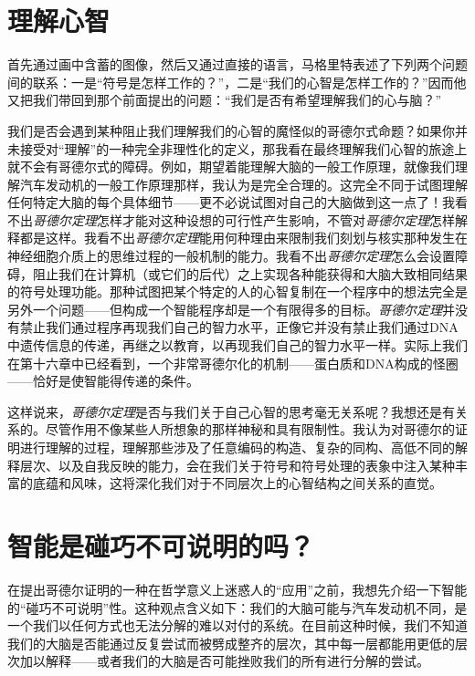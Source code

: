 \section{理解心智}

首先通过画中含蓄的图像，然后又通过直接的语言，马格里特表述了下列两个问题间的联系：一是“符号是怎样工作的？”，二是“我们的心智是怎样工作的？”因而他又把我们带回到那个前面提出的问题：“我们是否有希望理解我们的心与脑？”

我们是否会遇到某种阻止我们理解我们的心智的魔怪似的哥德尔式命题？如果你并未接受对“理解”的一种完全非理性化的定义，那我看在最终理解我们心智的旅途上就不会有哥德尔式的障碍。例如，期望着能理解大脑的一般工作原理，就像我们理解汽车发动机的一般工作原理那样，我认为是完全合理的。这完全不同于试图理解任何特定大脑的每个具体细节——更不必说试图对自己的大脑做到这一点了！我看不出\emph{哥德尔定理}怎样才能对这种设想的可行性产生影响，不管对\emph{哥德尔定理}怎样解释都是这样。我看不出\emph{哥德尔定理}能用何种理由来限制我们刻划与核实那种发生在神经细胞介质上的思维过程的一般机制的能力。我看不出\emph{哥德尔定理}怎么会设置障碍，阻止我们在计算机（或它们的后代）之上实现各种能获得和大脑大致相同结果的符号处理功能。那种试图把某个特定的人的心智复制在一个程序中的想法完全是另外一个问题——但构成一个智能程序却是一个有限得多的目标。\emph{哥德尔定理}并没有禁止我们通过程序再现我们自己的智力水平，正像它并没有禁止我们通过DNA中遗传信息的传递，再继之以教育，以再现我们自己的智力水平一样。实际上我们在第十六章中已经看到，一个非常哥德尔化的机制——蛋白质和DNA构成的怪圈——恰好是使智能得传递的条件。

这样说来，\emph{哥德尔定理}是否与我们关于自己心智的思考毫无关系呢？我想还是有关系的。尽管作用不像某些人所想象的那样神秘和具有限制性。我认为对哥德尔的证明进行理解的过程，理解那些涉及了任意编码的构造、复杂的同构、高低不同的解释层次、以及自我反映的能力，会在我们关于符号和符号处理的表象中注入某种丰富的底蕴和风味，这将深化我们对于不同层次上的心智结构之间关系的直觉。

\section{智能是碰巧不可说明的吗？}

在提出哥德尔证明的一种在哲学意义上迷惑人的“应用”之前，我想先介绍一下智能的“碰巧不可说明”性。这种观点含义如下：我们的大脑可能与汽车发动机不同，是一个我们以任何方式也无法分解的难以对付的系统。在目前这种时候，我们不知道我们的大脑是否能通过反复尝试而被劈成整齐的层次，其中每一层都能用更低的层次加以解释——或者我们的大脑是否可能挫败我们的所有进行分解的尝试。

